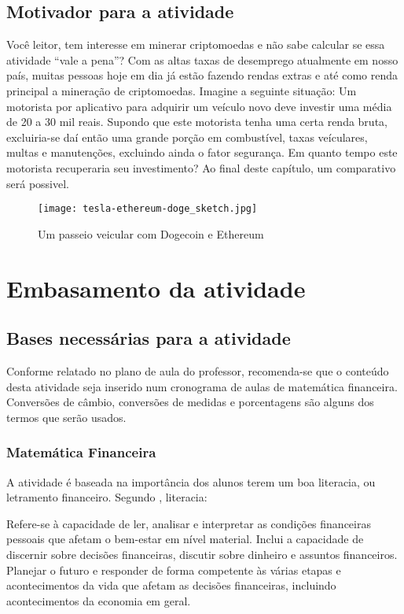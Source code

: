 \subsection{Motivador para a atividade}
Você leitor, tem interesse em minerar criptomoedas e não sabe calcular se essa atividade ``vale a pena''? Com as altas taxas de desemprego atualmente em nosso país, muitas pessoas hoje em dia já estão fazendo rendas extras e até como renda principal a mineração de criptomoedas. Imagine a seguinte situação: Um motorista por aplicativo para adquirir um veículo novo deve investir uma média de 20 a 30 mil reais. Supondo que este motorista tenha uma certa renda bruta, excluiria-se daí então uma grande porção em combustível, taxas veículares, multas e manutenções, excluindo ainda o fator segurança. Em quanto tempo este motorista recuperaria seu investimento? Ao final deste capítulo, um comparativo será possivel. \label{motiv}      

\begin{figure}[H]    
	\centering
	\caption{Um passeio veicular com Dogecoin e Ethereum}
	\texttt{[image: tesla-ethereum-doge\_sketch.jpg]}\\
\end{figure}

\section{Embasamento da atividade}
\subsection{Bases necessárias para a atividade}
Conforme relatado no plano de aula do professor, recomenda-se que o conteúdo desta atividade seja inserido num cronograma de aulas de matemática financeira. Conversões de câmbio, conversões de medidas e porcentagens são alguns dos termos que serão usados.

\subsubsection{Matemática Financeira}

A atividade é baseada na importância dos alunos terem um boa literacia, ou letramento financeiro. Segundo \cite{ORTON}, literacia: 

\begin{citacao}
		Refere-se à capacidade de ler, analisar e interpretar as condições financeiras pessoais que afetam o bem-estar em nível material. Inclui a capacidade de discernir sobre decisões financeiras, discutir sobre dinheiro e assuntos financeiros. Planejar o futuro e responder de forma competente às várias etapas e acontecimentos da vida que afetam as decisões financeiras, incluindo acontecimentos da economia em geral.
	\end{citacao}

